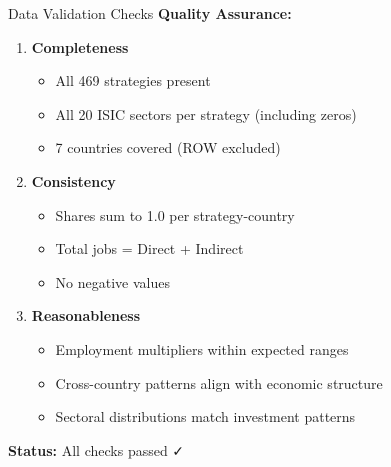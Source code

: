 \documentclass[10pt]{beamer}
\begin{document}
\begin{frame}{Data Validation Checks}
\textbf{Quality Assurance:}

\vspace{0.3cm}

\begin{enumerate}
    \item \textbf{Completeness}
    \begin{itemize}
        \item All 469 strategies present
        \item All 20 ISIC sectors per strategy (including zeros)
        \item 7 countries covered (ROW excluded)
    \end{itemize}

    \vspace{0.2cm}

    \item \textbf{Consistency}
    \begin{itemize}
        \item Shares sum to 1.0 per strategy-country
        \item Total jobs = Direct + Indirect
        \item No negative values
    \end{itemize}

    \vspace{0.2cm}

    \item \textbf{Reasonableness}
    \begin{itemize}
        \item Employment multipliers within expected ranges
        \item Cross-country patterns align with economic structure
        \item Sectoral distributions match investment patterns
    \end{itemize}
\end{enumerate}

\vspace{0.3cm}

\textbf{Status:} All checks passed ✓
\end{frame}

\end{document}
